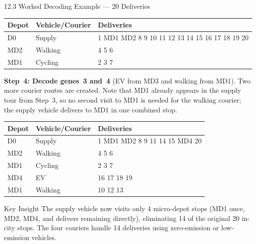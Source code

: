 \documentclass[aspectratio=169,10pt]{beamer}
\begin{document}
\begin{frame}[allowframebreaks]{12.3 Worked Decoding Example --- 20 Deliveries}
\begin{center}
  \begin{tabular}{lll}
    \toprule
    Depot & Vehicle/Courier & Deliveries \\
    \midrule
    D0  & Supply  & 1 MD1 MD2 8 9 10 11 12 13 14 15 16 17 18 19 20 \\
    MD2 & Walking & 4 5 6 \\
    MD1 & Cycling & 2 3 7 \\
    \bottomrule
  \end{tabular}
\end{center}

\textbf{Step~4: Decode genes~3 and~4} (EV from MD3 and walking from MD1).
Two more courier routes are created.
Note that MD1 already appears in the supply tour from Step~3,
so no second visit to MD1 is needed for the walking courier;
the supply vehicle delivers to MD1 in one combined stop.

\begin{center}
  \begin{tabular}{lll}
    \toprule
    Depot & Vehicle/Courier & Deliveries \\
    \midrule
    D0  & Supply  & 1 MD1 MD2 8 9 11 14 15 MD4 20 \\
    MD2 & Walking & 4 5 6 \\
    MD1 & Cycling & 2 3 7 \\
    MD4 & EV      & 16 17 18 19 \\
    MD1 & Walking & 10 12 13 \\
    \bottomrule
  \end{tabular}
\end{center}

\begin{alertblock}{Key Insight}
  The supply vehicle now visits only 4 micro-depot stops
  (MD1 once, MD2, MD4, and delivers remaining directly),
  eliminating 14 of the original 20 in-city stops.
  The four couriers handle 14 deliveries using zero-emission
  or low-emission vehicles.
\end{alertblock}

\end{frame}
\end{document}
